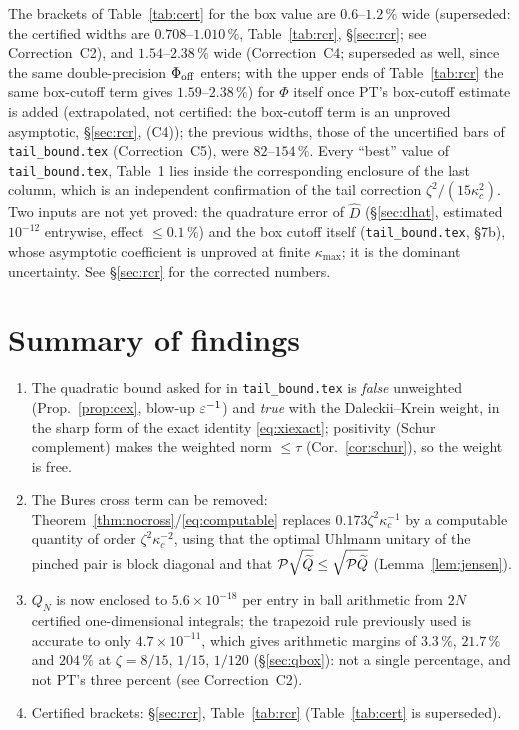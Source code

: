 \documentclass[11pt]{article}
\begin{document}
\begin{verdictok}
The brackets of Table~\ref{tab:cert} for the box value are $0.6$--$1.2\,\%$ wide (superseded: the certified widths are $0.708$--$1.010\,\%$, Table~\ref{tab:rcr}, \S\ref{sec:rcr}; see Correction~C2), and $1.54$--$2.38\,\%$ wide (Correction~C4; superseded as well, since the same double-precision $\Phi_{\rm off}$ enters; with the upper ends of Table~\ref{tab:rcr} the same box-cutoff term gives $1.59$--$2.38\,\%$) for
$\Phi$ itself once PT's box-cutoff estimate is added (extrapolated, not certified: the box-cutoff term is an unproved asymptotic, \S\ref{sec:rcr}, (C4)); the previous widths, those of the uncertified bars of \texttt{tail\_bound.tex} (Correction~C5), were
$82$--$154\,\%$.  Every ``best'' value of \texttt{tail\_bound.tex}, Table~1 lies inside the
corresponding enclosure of the last column, which is an independent confirmation of the tail
correction $\zeta^2/(15\kappa_c^2)$.  Two inputs are not yet proved: the quadrature error of
$\widehat D$ (\S\ref{sec:dhat}, estimated $10^{-12}$ entrywise, effect $\le0.1\,\%$) and the box
cutoff itself (\texttt{tail\_bound.tex}, \S7b), whose asymptotic coefficient is unproved at finite
$\kappa_{\max}$; it is the dominant uncertainty.  See \S\ref{sec:rcr} for the corrected numbers.
\end{verdictok}
\section{Summary of findings}\label{sec:findings}
\begin{enumerate}[leftmargin=1.6em]
\item The quadratic bound asked for in \texttt{tail\_bound.tex} is \emph{false} unweighted
 (Prop.~\ref{prop:cex}, blow-up $\varepsilon^{-1}$) and \emph{true} with the Daleckii--Krein weight, in the
 sharp form of the exact identity \eqref{eq:xiexact}; positivity (Schur complement) makes the
 weighted norm $\le\tau$ (Cor.~\ref{cor:schur}), so the weight is free.
\item The Bures cross term can be removed: Theorem~\ref{thm:nocross}/\eqref{eq:computable} replaces
 $0.173\zeta^2\kappa_c^{-1}$ by a computable quantity of order $\zeta^2\kappa_c^{-2}$, using that the
 optimal Uhlmann unitary of the pinched pair is block diagonal and that $\mathcal P\sqrt{\widetilde Q}\le
 \sqrt{\mathcal P\widetilde Q}$ (Lemma~\ref{lem:jensen}).
\item $Q_N$ is now enclosed to $5.6\times10^{-18}$ per entry in ball arithmetic from $2N$ certified
 one-dimensional integrals; the trapezoid rule previously used is accurate to only
 $4.7\times10^{-11}$, which gives arithmetic margins of $3.3\,\%$, $21.7\,\%$ and $204\,\%$ at $\zeta=8/15$, $1/15$, $1/120$ (\S\ref{sec:qbox}): not a single percentage, and not PT's three percent (see Correction~C2).
\item Certified brackets: \S\ref{sec:rcr}, Table~\ref{tab:rcr} (Table~\ref{tab:cert} is superseded).
\end{enumerate}
\end{document}
